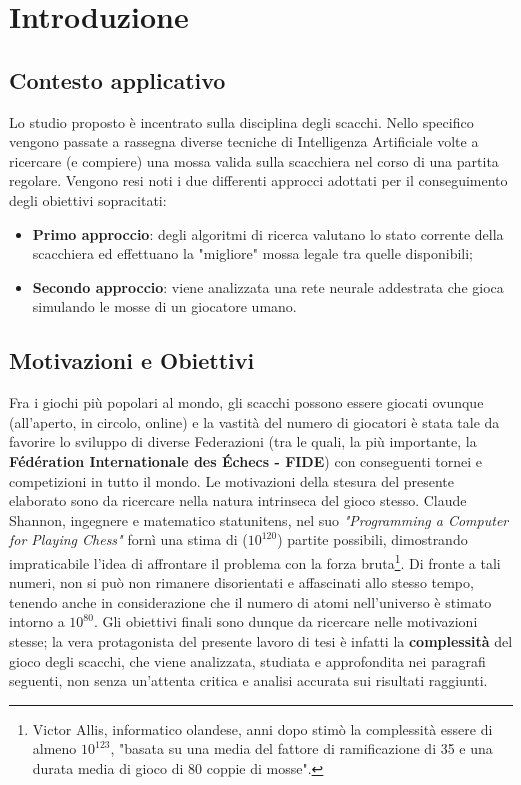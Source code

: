 \chapter{Introduzione}
\section{Contesto applicativo}
Lo studio proposto è incentrato sulla disciplina degli scacchi. Nello specifico vengono passate a rassegna diverse tecniche di 
Intelligenza Artificiale volte a ricercare (e compiere) una mossa valida sulla scacchiera nel corso di una partita regolare.
Vengono resi noti i due differenti approcci adottati per il conseguimento degli obiettivi sopracitati: 
\begin{itemize}
    \item \textbf{Primo approccio}: degli algoritmi di ricerca valutano lo stato corrente della scacchiera ed effettuano la "migliore"
    mossa legale tra quelle disponibili;
    \item \textbf{Secondo approccio}: viene analizzata una rete neurale addestrata che gioca simulando le mosse di un giocatore umano. 
\end{itemize}

\section{Motivazioni e Obiettivi} %
Fra i giochi più popolari al mondo, gli scacchi possono essere giocati ovunque (all'aperto, in circolo, online) e la vastità del numero di 
giocatori è stata tale da favorire lo sviluppo di diverse Federazioni (tra le quali, la più importante, la 
\textbf{Fédération Internationale des Échecs - FIDE}) con conseguenti tornei e competizioni in tutto il mondo. 
Le motivazioni della stesura del presente elaborato sono da ricercare nella natura intrinseca del gioco stesso. 
Claude Shannon, ingegnere e matematico statunitens, nel suo \textit{"Programming a Computer for Playing Chess"} fornì una stima di ($10^{120}$)
partite possibili, dimostrando impraticabile l'idea di affrontare il problema con la forza bruta\footnote{Victor Allis, informatico olandese, 
anni dopo stimò la complessità essere di almeno $10^{123}$, "basata su una media del fattore di ramificazione di 35 e una 
durata media di gioco di 80 coppie di mosse".}. Di fronte a tali numeri, non si può non rimanere disorientati e affascinati allo
stesso tempo, tenendo anche in considerazione che il numero di atomi nell'universo è stimato intorno a $10^{80}$. 
Gli obiettivi finali sono dunque da ricercare nelle motivazioni stesse; la vera protagonista del
presente lavoro di tesi è infatti la \textbf{complessità} del gioco degli scacchi, che viene analizzata, studiata e approfondita nei paragrafi
seguenti, non senza un'attenta critica e analisi accurata sui risultati raggiunti.

